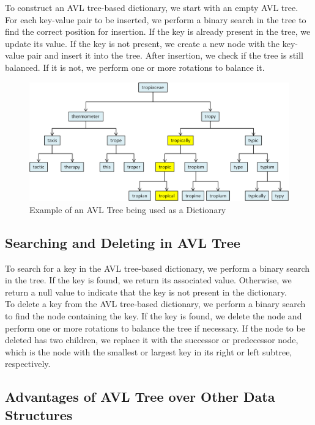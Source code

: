 \documentclass[11pt]{article}
\begin{document}
To construct an AVL tree-based dictionary, we start with an empty AVL tree. For each key-value pair to be inserted, we perform a binary search in the tree to find the correct position for insertion. If the key is already present in the tree, we update its value. If the key is not present, we create a new node with the key-value pair and insert it into the tree. After insertion, we check if the tree is still balanced. If it is not, we perform one or more rotations to balance it.\\

\begin{figure}[H]
    \centering
    \includegraphics[width=.85\textwidth]{balanced_bst2.png}
    \caption{Example of an AVL Tree being used as a Dictionary}
\end{figure}

\subsection{Searching and Deleting in AVL Tree}

To search for a key in the AVL tree-based dictionary, we perform a binary search in the tree. If the key is found, we return its associated value. Otherwise, we return a null value to indicate that the key is not present in the dictionary.\\

To delete a key from the AVL tree-based dictionary, we perform a binary search to find the node containing the key. If the key is found, we delete the node and perform one or more rotations to balance the tree if necessary. If the node to be deleted has two children, we replace it with the successor or predecessor node, which is the node with the smallest or largest key in its right or left subtree, respectively.

\subsection{Advantages of AVL Tree over Other Data Structures}
\end{document}

